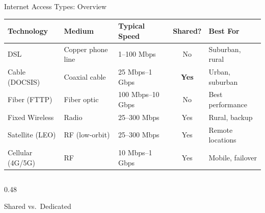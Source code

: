 \documentclass[aspectratio=169]{beamer}  %
\begin{document}

\begin{frame}[t]{Internet Access Types: Overview}
    \begin{center}
        \footnotesize
        \begin{tabular}{l l l c l}
            \toprule
            \textbf{Technology} & \textbf{Medium} & \textbf{Typical Speed} & \textbf{Shared?} & \textbf{Best For} \\
            \midrule
            \rowcolor{ipblue!15}
            DSL          & Copper phone line & 1--100 Mbps       & No          & Suburban, rural \\
            \rowcolor{networkgreen!15}
            Cable (DOCSIS) & Coaxial cable   & 25 Mbps--1 Gbps   & \textbf{Yes} & Urban, suburban \\
            \rowcolor{rctcblue!10}
            Fiber (FTTP)   & Fiber optic     & 100 Mbps--10 Gbps & No          & Best performance \\
            \rowcolor{aborange!15}
            Fixed Wireless & Radio           & 25--300 Mbps      & Yes         & Rural, backup \\
            \rowcolor{alertred!10}
            Satellite (LEO) & RF (low-orbit) & 25--300 Mbps      & Yes         & Remote locations \\
            \rowcolor{ippurple!10}
            Cellular (4G/5G) & RF            & 10 Mbps--1 Gbps   & Yes         & Mobile, failover \\
            \bottomrule
        \end{tabular}
    \end{center}
    \vspace{0.4em}
    \begin{columns}[T]
        \begin{column}{0.48\textwidth}
            \begin{alertblock}{Shared vs.\ Dedicated}
                \footnotesize

\end{alertblock}
\end{column}
\end{columns}
\end{frame}
\end{document}
